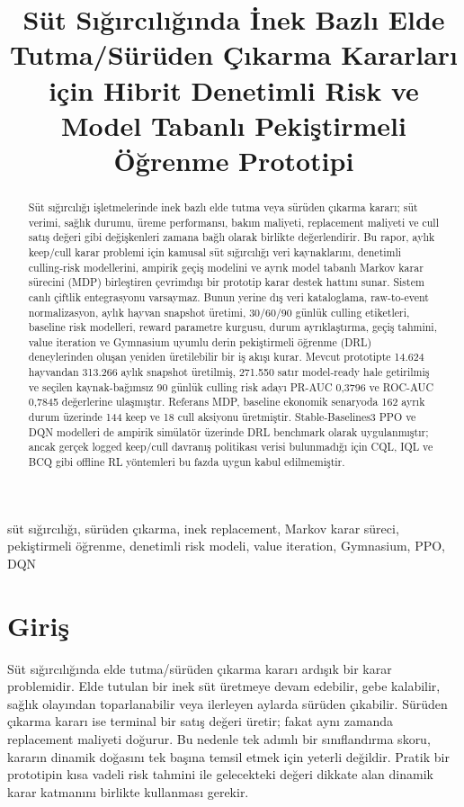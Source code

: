 \documentclass[conference]{IEEEtran}
\title{Süt Sığırcılığında İnek Bazlı Elde Tutma/Sürüden Çıkarma Kararları için Hibrit Denetimli Risk ve Model Tabanlı Pekiştirmeli Öğrenme Prototipi}
\author{
\IEEEauthorblockN{Artun Kara}
\IEEEauthorblockA{
Kocaeli Üniversitesi\\
Kocaeli, Türkiye\\
artunankara@gmail.com}
}
\begin{document}
\maketitle

\begin{abstract}
Süt sığırcılığı işletmelerinde inek bazlı elde tutma veya sürüden çıkarma
kararı; süt verimi, sağlık durumu, üreme performansı, bakım maliyeti,
replacement maliyeti ve cull satış değeri gibi değişkenleri zamana bağlı
olarak birlikte değerlendirir. Bu rapor, aylık keep/cull karar problemi için
kamusal süt sığırcılığı veri kaynaklarını, denetimli culling-risk modellerini,
ampirik geçiş modelini ve ayrık model tabanlı Markov karar sürecini (MDP)
birleştiren çevrimdışı bir prototip karar destek hattını sunar. Sistem canlı
çiftlik entegrasyonu varsaymaz. Bunun yerine dış veri kataloglama, raw-to-event
normalizasyon, aylık hayvan snapshot üretimi, 30/60/90 günlük culling etiketleri,
baseline risk modelleri, reward parametre kurgusu, durum ayrıklaştırma, geçiş
tahmini, value iteration ve Gymnasium uyumlu derin pekiştirmeli öğrenme (DRL)
deneylerinden oluşan yeniden üretilebilir bir iş akışı kurar. Mevcut prototipte
14.624 hayvandan 313.266 aylık snapshot üretilmiş, 271.550 satır model-ready
hale getirilmiş ve seçilen kaynak-bağımsız 90 günlük culling risk adayı PR-AUC
0,3796 ve ROC-AUC 0,7845 değerlerine ulaşmıştır. Referans MDP, baseline ekonomik
senaryoda 162 ayrık durum üzerinde 144 keep ve 18 cull aksiyonu üretmiştir.
Stable-Baselines3 PPO ve DQN modelleri de ampirik simülatör üzerinde DRL
benchmark olarak uygulanmıştır; ancak gerçek logged keep/cull davranış
politikası verisi bulunmadığı için CQL, IQL ve BCQ gibi offline RL yöntemleri
bu fazda uygun kabul edilmemiştir.
\end{abstract}

\begin{IEEEkeywords}
süt sığırcılığı, sürüden çıkarma, inek replacement, Markov karar süreci,
pekiştirmeli öğrenme, denetimli risk modeli, value iteration, Gymnasium, PPO,
DQN
\end{IEEEkeywords}

\section{Giriş}
Süt sığırcılığında elde tutma/sürüden çıkarma kararı ardışık bir karar
problemidir. Elde tutulan bir inek süt üretmeye devam edebilir, gebe kalabilir,
sağlık olayından toparlanabilir veya ilerleyen aylarda sürüden çıkabilir.
Sürüden çıkarma kararı ise terminal bir satış değeri üretir; fakat aynı zamanda
replacement maliyeti doğurur. Bu nedenle tek adımlı bir sınıflandırma skoru,
kararın dinamik doğasını tek başına temsil etmek için yeterli değildir. Pratik
bir prototipin kısa vadeli risk tahmini ile gelecekteki değeri dikkate alan
dinamik karar katmanını birlikte kullanması gerekir.
\end{document}
